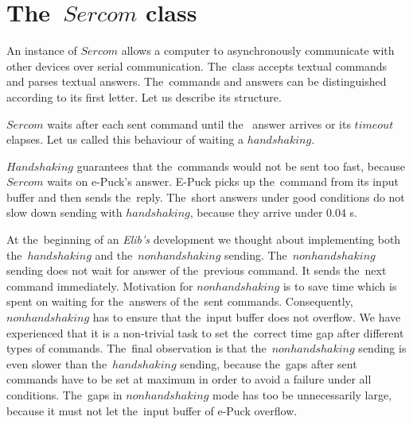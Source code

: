 
\section{The~$Sercom$ class}\label{sec:sercom}
  An instance of $Sercom$ allows a computer to asynchronously communicate with other devices
  over serial communication. The~class accepts textual commands and parses textual answers.
  The~commands and answers can be distinguished according to its first letter.
  Let us describe its structure.
 
  \begin{definition}
  $Sercom$ waits after each sent command until the~ answer arrives or its $timeout$ elapses.
  Let us called this behaviour of waiting a $handshaking$.
  \end{definition}

  $Handshaking$ guarantees that the~commands would not be sent too fast,
  because $Sercom$ waits on e-Puck's answer. E-Puck picks up the~command from its input buffer and then sends the~reply.
  The~short answers under good conditions do not slow down sending with $handshaking$, because
  they arrive under 0.04 s. 
 

  At the~beginning of an {\it Elib's} development we thought about implementing both the~$handshaking$
  and the~$nonhandshaking$ sending.
  The~$nonhandshaking$ sending does not wait for answer of the~previous command. It sends the~next command immediately. 
  Motivation for $nonhandshaking$ is to save time which is spent on waiting for the~answers of the~sent commands.
  Consequently, $nonhandshaking$ has to ensure that the~input buffer does not overflow.
  We have experienced that it is a non-trivial task to set the~correct time gap after different types of commands. 
  The~final observation is that the~$nonhandshaking$ sending is even slower than the~$handshaking$ sending, 
  because the~gaps after sent commands have to be set at maximum in order to avoid a failure under all conditions. 
  The~gaps in $nonhandshaking$ mode has too be unnecessarily large, 
  because it must not let the~input buffer of e-Puck overflow.

